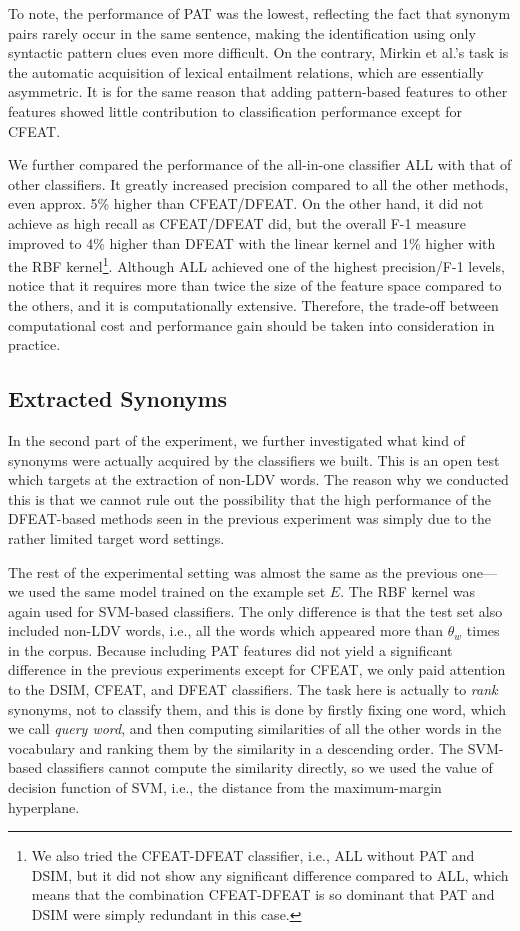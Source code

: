 \documentclass[english]{jnlp_1.4}
\begin{document}
To note, the performance of PAT was the lowest, reflecting the fact
that synonym pairs rarely occur in the same sentence, making the
identification using only syntactic pattern clues even more
difficult. On the contrary, Mirkin et al.'s task is the automatic
acquisition of lexical entailment relations, which are essentially
asymmetric. It is for the same reason that adding pattern-based
features to other features showed little contribution to
classification performance except for CFEAT.


We further compared the performance of the all-in-one classifier ALL
with that of other classifiers. It greatly increased precision
compared to all the other methods, even approx. 5\% higher than
CFEAT/DFEAT. On the other hand, it did not achieve as high recall as
CFEAT/DFEAT did, but the overall F-1 measure improved to 4\% higher
than DFEAT with the linear kernel and 1\% higher with the RBF
kernel\footnote{We also tried the CFEAT-DFEAT classifier, i.e., ALL
without PAT and DSIM, but it did not show any significant difference
compared to ALL, which means that the combination CFEAT-DFEAT is so
dominant that PAT and DSIM were simply redundant in this
case.}. Although ALL achieved one of the highest precision/F-1 levels,
notice that it requires more than twice the size of the feature space
compared to the others, and it is computationally
extensive. Therefore, the trade-off between computational cost and
performance gain should be taken into consideration in practice.


\subsection{Extracted Synonyms}

In the second part of the experiment, we further investigated what
kind of synonyms were actually acquired by the classifiers we
built. This is an open test which targets at the extraction of non-LDV
words. The reason why we conducted this is that we cannot rule out the
possibility that the high performance of the DFEAT-based methods seen
in the previous experiment was simply due to the rather limited target
word settings.

The rest of the experimental setting was almost the same as the
previous one---we used the same model trained on the example set
$E$. The RBF kernel was again used for SVM-based classifiers. The only
difference is that the test set also included non-LDV words, i.e., all
the words which appeared more than $\theta_w$ times in the
corpus. Because including PAT features did not yield a significant
difference in the previous experiments except for CFEAT, we only paid
attention to the DSIM, CFEAT, and DFEAT classifiers. The task here is
actually to \textit{rank} synonyms, not to classify them, and this is
done by firstly fixing one word, which we call \textit{query word}, and
then computing similarities of all the other words in the vocabulary
and ranking them by the similarity in a descending order. The
SVM-based classifiers cannot compute the similarity directly, so we
used the value of decision function of SVM, i.e., the distance from
the maximum-margin hyperplane.
\end{document}
